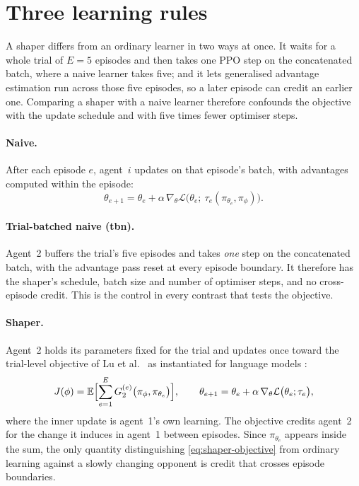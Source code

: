 \section{Three learning rules}
\label{sec:method-rules}

A shaper differs from an ordinary learner in two ways at once.
It waits for a whole trial of \(E=5\) episodes and then takes one PPO step
on the concatenated batch, where a naive learner takes five; and it lets
generalised advantage estimation run across those five episodes, so a later
episode can credit an earlier one.
Comparing a shaper with a naive learner therefore confounds the objective
with the update schedule and with five times fewer optimiser steps.

\paragraph{Naive.}
After each episode \(e\), agent~\(i\) updates on that episode's batch, with
advantages computed within the episode:
\begin{equation}
  \theta_{e+1}=\theta_e+\alpha\,\nabla_{\theta}\mathcal{L}
  \bigl(\theta_e;\ \tau_e(\pi_{\theta_e},\pi_{\phi})\bigr).
  \label{eq:naive-update}
\end{equation}

\paragraph{Trial-batched naive (tbn).}
Agent~2 buffers the trial's five episodes and takes \emph{one} step on the
concatenated batch, with the advantage pass reset at every episode
boundary.
It therefore has the shaper's schedule, batch size and number of optimiser
steps, and no cross-episode credit.
This is the control in every contrast that tests the objective.

\paragraph{Shaper.}
Agent~2 holds its parameters fixed for the trial and updates once toward the
trial-level objective of Lu et al.\ \cite{lu2022} as instantiated for
language models \cite{garciasegura2025}:
\begin{equation}
  J(\phi)=\mathbb{E}\Bigl[\sum_{e=1}^{E}G^{(e)}_{2}\bigl(\pi_{\phi},\pi_{\theta_e}\bigr)\Bigr],
  \qquad
  \theta_{e+1}=\theta_e+\alpha\,\nabla_{\theta}\mathcal{L}\bigl(\theta_e;\tau_e\bigr),
  \label{eq:shaper-objective}
\end{equation}
where the inner update is agent~1's own learning.
The objective credits agent~2 for the change it induces in agent~1 between
episodes.
Since \(\pi_{\theta_e}\) appears inside the sum, the only quantity
distinguishing \eqref{eq:shaper-objective} from ordinary learning against a
slowly changing opponent is credit that crosses episode boundaries.

